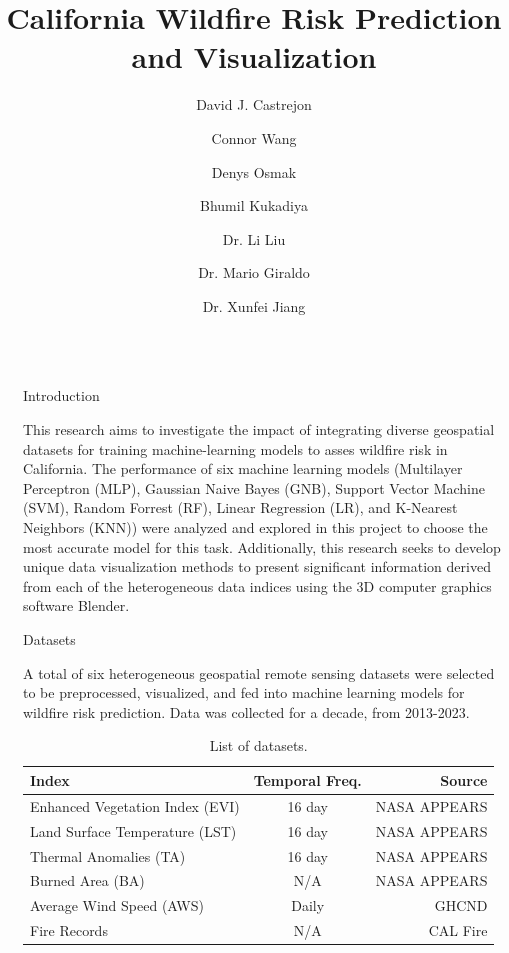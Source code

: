 \documentclass[final]{beamer}
\title{California Wildfire Risk Prediction and Visualization}
\author{David J. Castrejon \inst{1} \and Connor Wang \inst{2} \and Denys Osmak \inst{3}\\ \and Bhumil Kukadiya \inst{4} \and Dr. Li Liu \inst{4} \and Dr. Mario Giraldo \inst{4} \and Dr. Xunfei Jiang \inst{4} }
\institute [shortinst]{
\inst{1} California State University, Sacramento \samelineand \inst{2} University of California, Los Angeles \samelineand \inst{3}  The University of Texas at Austin \samelineand \inst{4} California State University, Northridge }
\newlength{\sepwidth}
\newlength{\colwidth}
\newcommand{\separatorcolumn}{\begin{column}{\sepwidth}\end{column}}
\begin{document}
\begin{frame}[t]
\begin{columns}[t]
\separatorcolumn

\begin{column}{\colwidth}
  
  \begin{block}{Introduction}

    This research aims to investigate the impact of integrating diverse geospatial datasets for training machine-learning models to asses wildfire risk in California. The performance of six machine learning models (Multilayer Perceptron (MLP), Gaussian Naive Bayes (GNB), Support Vector Machine (SVM), Random Forrest (RF), Linear Regression (LR), and K-Nearest Neighbors (KNN)) were analyzed and explored in this project to choose the most accurate model for this task.  Additionally, this research seeks to develop unique data visualization methods to present significant information derived from each of the heterogeneous data indices using the 3D computer graphics software Blender. 
    

  
  \end{block}

  \begin{alertblock}{Datasets}

    A total of six heterogeneous geospatial remote sensing datasets were selected to be preprocessed, visualized, and fed into machine learning models for wildfire risk prediction. Data was collected for a decade, from 2013-2023.

    \begin{table}
      \centering
      \caption{List of datasets.}
      \begin{tabular}{l c r}
        \toprule
        \textbf{Index} & \textbf{Temporal Freq.} & \textbf{Source} \\
        \midrule
        Enhanced Vegetation Index (EVI) & 16 day & NASA APPEARS \\
        Land Surface Temperature (LST)& 16 day & NASA APPEARS \\
        Thermal Anomalies (TA) & 16 day & NASA APPEARS \\
        Burned Area (BA) & N/A & NASA APPEARS \\
        Average Wind Speed (AWS) & Daily & GHCND\cite{wind} \\ 
        Fire Records & N/A & CAL Fire
        \bottomrule
      \end{tabular}
    \end{table}


\end{alertblock}
\end{column}
\end{columns}
\end{frame}
\end{document}
